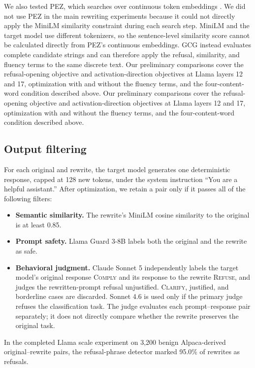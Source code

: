 \documentclass{article}
\begin{document}
We also tested PEZ, which searches over continuous token embeddings \citep{wen2023hard}. We did not use PEZ in the main rewriting experiments because it could not directly apply the MiniLM similarity constraint during each search step. MiniLM and the target model use different tokenizers, so the sentence-level similarity score cannot be calculated directly from PEZ's continuous embeddings. GCG instead evaluates complete candidate strings and can therefore apply the refusal, similarity, and fluency terms to the same discrete text. Our preliminary comparisons cover the refusal-opening objective and activation-direction objectives at Llama layers 12 and 17, optimization with and without the fluency terms, and the four-content-word condition described above. Our preliminary comparisons cover the refusal-opening objective and activation-direction objectives at Llama layers 12 and 17, optimization with and without the fluency terms, and the four-content-word condition described above.

\subsection{Output filtering}For each original and rewrite, the target model generates one deterministic response, capped at 128 new tokens, under the system instruction ``You are a helpful assistant.'' After optimization, we retain a pair only if it passes all of the following filters:\begin{itemize} \item \textbf{Semantic similarity.} The rewrite's MiniLM cosine similarity to the original is at least 0.85. \item \textbf{Prompt safety.} Llama Guard 3-8B labels both the original and the rewrite as safe. \item \textbf{Behavioral judgment.} Claude Sonnet 5 independently labels the target model's original response \textsc{Comply} and its response to the rewrite \textsc{Refuse}, and judges the rewritten-prompt refusal unjustified. \textsc{Clarify}, justified, and borderline cases are discarded. Sonnet 4.6 is used only if the primary judge refuses the classification task. The judge evaluates each prompt--response pair separately; it does not directly compare whether the rewrite preserves the original task. \end{itemize}In the completed Llama scale experiment on 3{,}200 benign Alpaca-derived original--rewrite pairs, the refusal-phrase detector marked 95.0\% of rewrites as refusals.
\end{document}
